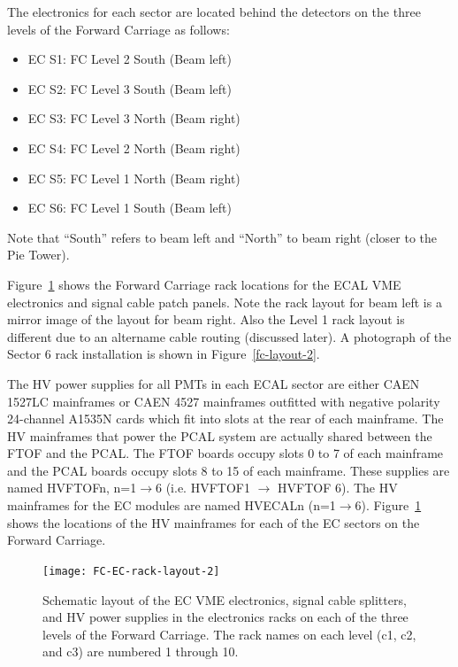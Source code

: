 \documentclass[letterpaper,10pt]{article}
\begin{document}
The electronics for each sector are located behind the detectors on the three levels of the Forward 
Carriage as follows:

\vskip 0.5cm

\begin{minipage}{0.5\textwidth}
\begin{itemize}
\item EC S1: FC Level 2 South (Beam left)
\item EC S2: FC Level 3 South (Beam left)
\item EC S3: FC Level 3 North (Beam right)
\end{itemize}
\end{minipage}
\begin{minipage}{0.5\textwidth}
\begin{itemize}
\item EC S4: FC Level 2 North (Beam right)
\item EC S5: FC Level 1 North (Beam right)
\item EC S6: FC Level 1 South (Beam left)
\end{itemize}
\end{minipage}

\vskip 0.5cm

Note that ``South'' refers to beam left and ``North'' to beam right (closer to the Pie Tower).

Figure~\ref{fc-layout-1} shows the Forward Carriage rack locations for the ECAL VME electronics and signal cable patch 
panels.  Note the rack layout for beam left is a mirror image of the layout for beam right.  Also the Level 1 rack layout
is different due to an altername cable routing (discussed later).  A photograph of the Sector 6 rack installation is
shown in Figure~\ref{fc-layout-2}.

The HV power supplies for all PMTs in each ECAL sector are either CAEN 1527LC mainframes or CAEN 4527 mainframes 
outfitted with negative polarity 24-channel A1535N cards which fit into slots at the rear of each
mainframe. The HV mainframes that power the PCAL 
system are actually shared between the FTOF and the PCAL. The FTOF boards occupy slots 0 to 7 of each 
mainframe and the PCAL boards occupy slots 8 to 15 of each mainframe. These supplies are named HVFTOFn, 
n=1$\to$6 (i.e. HVFTOF1 $\to$ HVFTOF 6). The HV mainframes for the EC modules are named HVECALn (n=1$\to$6).
Figure~\ref{fc-layout-1} shows the locations of the HV mainframes for each of the EC sectors on the Forward Carriage.


\begin{figure}[htbp]
  \centering
  \texttt{[image: FC-EC-rack-layout-2]}
  \vspace{2mm}
  \caption{Schematic layout of the EC VME electronics, signal cable splitters, and HV power 
  supplies in the electronics racks on each of the three levels of the Forward Carriage. The rack names on each level (c1, c2,
  and c3) are numbered 1 through 10.}
  \label{fc-layout-1} 
\end{figure}
\end{document}
